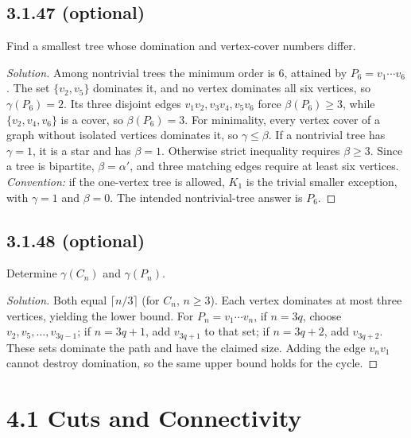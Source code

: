 \documentclass[12pt]{amsart}
\newenvironment{solution}{\begin{proof}[Solution]}{\end{proof}}
\begin{document}
    \subsection*{3.1.47 (optional)} Find a smallest tree whose domination and vertex-cover numbers differ.
    \begin{solution}Among nontrivial trees the minimum order is $6$, attained by $P_6=v_1\cdots v_6$. The set $\{v_2,v_5\}$ dominates it, and no vertex dominates all six vertices, so $\gamma(P_6)=2$. Its three disjoint edges $v_1v_2,v_3v_4,v_5v_6$ force $\beta(P_6)\ge3$, while $\{v_2,v_4,v_6\}$ is a cover, so $\beta(P_6)=3$.
    For minimality, every vertex cover of a graph without isolated vertices dominates it, so $\gamma\le\beta$. If a nontrivial tree has $\gamma=1$, it is a star and has $\beta=1$. Otherwise strict inequality requires $\beta\ge3$. Since a tree is bipartite, $\beta=\alpha'$, and three matching edges require at least six vertices.
        \emph{Convention:} if the one-vertex tree is allowed, $K_1$ is the trivial smaller exception, with $\gamma=1$ and $\beta=0$. The intended nontrivial-tree answer is $P_6$.\end{solution}

    \subsection*{3.1.48 (optional)} Determine $\gamma(C_n)$ and $\gamma(P_n)$.
    \begin{solution}Both equal $\lceil n/3\rceil$ (for $C_n$, $n\ge3$). Each vertex dominates at most three vertices, yielding the lower bound.
    For $P_n=v_1\cdots v_n$, if $n=3q$, choose $v_2,v_5,\ldots,v_{3q-1}$; if $n=3q+1$, add $v_{3q+1}$ to that set; if $n=3q+2$, add $v_{3q+2}$. These sets dominate the path and have the claimed size. Adding the edge $v_nv_1$ cannot destroy domination, so the same upper bound holds for the cycle.\end{solution}

    \section*{4.1 Cuts and Connectivity}
\end{document}
